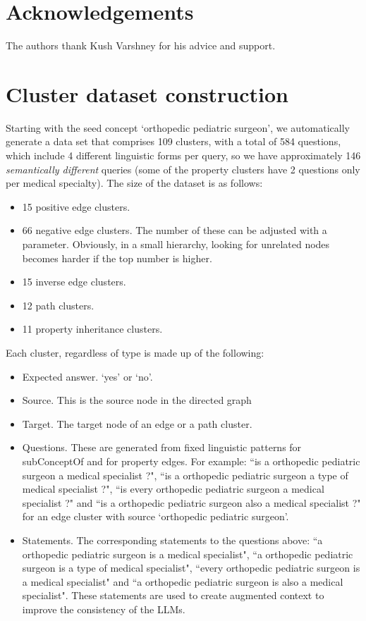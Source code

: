 \documentclass{article} %
\begin{document}
\section*{Acknowledgements}
\label{sec:ack}
The authors thank Kush Varshney for his advice and support.




\appendix
\section{Cluster dataset construction} \label{sec:appendix A}
Starting with the seed concept `orthopedic pediatric surgeon', we automatically generate a data set that comprises 109 clusters, with a total of 584 questions, which include 4 different linguistic forms per query, so we have approximately 146 \textit{semantically different} queries (some of the property clusters have 2 questions only per medical specialty). The size of the dataset is as follows: 

\begin{itemize}
\item 15 positive edge clusters.
\item 66 negative edge clusters. The number of these can be adjusted with a parameter. Obviously, in a small hierarchy, looking for unrelated nodes becomes harder if the top number is higher. 
\item 15 inverse edge clusters. 
\item 12 path clusters. 
\item 11 property inheritance clusters. 
\end{itemize}

Each cluster, regardless of type is made up of the following:

\begin{itemize}
\item Expected answer. `yes' or `no'.
\item Source. This is the source node in the directed graph
\item Target. The target node of an edge or a path cluster. 
\item Questions. These are generated from fixed linguistic patterns for subConceptOf and for property edges. For example: ``is a orthopedic pediatric surgeon a medical specialist ?",
``is a orthopedic pediatric surgeon a type of medical specialist ?", ``is every orthopedic pediatric surgeon a medical specialist ?" and ``is a orthopedic pediatric surgeon also a medical specialist ?" for an edge cluster with source `orthopedic pediatric surgeon'. 
\item Statements. The corresponding statements to the questions above:  ``a orthopedic pediatric surgeon is a medical specialist", ``a orthopedic pediatric surgeon is a type of medical specialist", ``every orthopedic pediatric surgeon is a medical specialist" and ``a orthopedic pediatric surgeon is also a medical specialist". These statements are used to create augmented context to improve the consistency of the LLMs.
\end{itemize}
\end{document}
